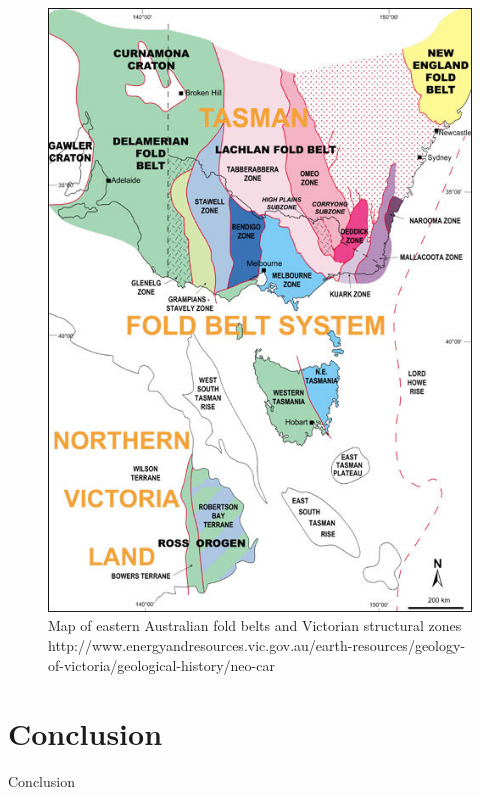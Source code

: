 \documentclass[a4paper]{article}
\begin{document}
\begin{figure}[H]
\centering
\includegraphics[width=1\textwidth]{Geology_Neoproterozoic_Fig_2.jpg}
\caption{\label{fig:
VicStructuralZones}Map of eastern Australian fold belts and Victorian structural zones http://www.energyandresources.vic.gov.au/earth-resources/geology-of-victoria/geological-history/neo-car}
\end{figure}
 



\section{Conclusion}

Conclusion



\newpage


\end{document}
